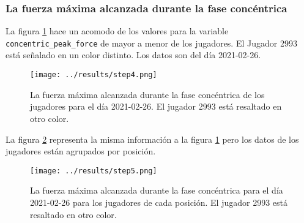 \subsubsection*{La fuerza máxima alcanzada durante la fase concéntrica}
La figura \ref{fig:step4} hace un acomodo de los valores para la variable \texttt{concentric\_peak\_force}
de mayor a menor de los jugadores. El Jugador 2993 está señalado en un color distinto. Los datos
son del día 2021-02-26.
\begin{figure}[H]
\centering
\texttt{[image: ../results/step4.png]}
\caption{La fuerza máxima alcanzada durante la fase concéntrica de los jugadores para el día 2021-02-26. El jugador 2993 está resaltado en otro color.}
\label{fig:step4}
\end{figure}

La figura \ref{fig:step5} representa la misma información a la figura \ref{fig:step4} pero los datos
de los jugadores están agrupados por posición.

\begin{figure}[H]
\centering
\texttt{[image: ../results/step5.png]}
\caption{La fuerza máxima alcanzada durante la fase concéntrica para el día 2021-02-26 para los jugadores de cada posición. El jugador 2993 está resaltado en otro color.}
\label{fig:step5}
\end{figure}


